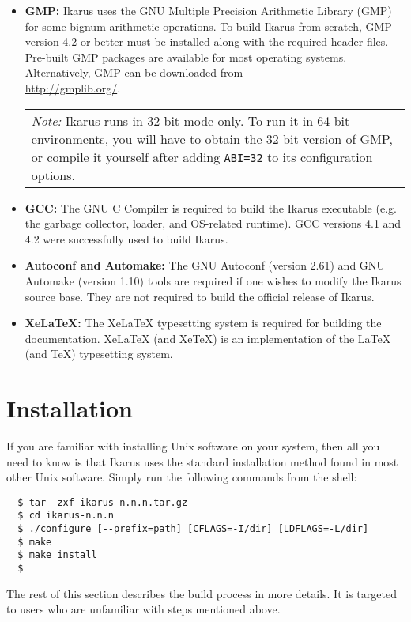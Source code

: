 \documentclass[onecolumn, 12pt, twoside, openright, dvipdfm]{book}
\newcommand{\BoxedText}[2]{
  \vspace{.05in}
  \begin{center}
    \begin{tabular}{|p{4.6in}|} {\large \emph{#1}} #2 \end{tabular}
  \end{center}
  \vspace{.05in}
}
\begin{document}
\begin{itemize}
\item\textbf{GMP:} Ikarus uses the GNU Multiple Precision Arithmetic
Library (GMP) for some bignum arithmetic operations.  To build
Ikarus from scratch, GMP version 4.2 or better must be installed
along with the required header files.  Pre-built GMP packages  are
available for most operating systems.  Alternatively, GMP can be
downloaded from \\
\url{http://gmplib.org/}.

\BoxedText{Note:}{Ikarus runs in 32-bit mode only.  
To run it in 64-bit environments, you will have to obtain the 32-bit
version of GMP, or compile it yourself after adding \texttt{ABI=32}
to its configuration options.}


\item\textbf{GCC:} The GNU C Compiler is required to build the Ikarus
executable (e.g. the garbage collector, loader, and OS-related
runtime).  GCC versions 4.1 and 4.2 were successfully used to build
Ikarus.

\item\textbf{Autoconf and Automake:} The GNU Autoconf (version 2.61)
and GNU Automake (version 1.10) tools are required if one
wishes to modify the Ikarus source base.  They are not
required to build the official release of Ikarus.

\item\textbf{XeLaTeX:}  The XeLaTeX typesetting system is required
for building the documentation.  XeLaTeX (and XeTeX) is an
implementation of the LaTeX (and TeX) typesetting system.

\end{itemize}

\section{Installation}

If you are familiar with installing Unix software on your system,
then all you need to know is that Ikarus uses the standard
installation method found in most other Unix software.  Simply run
the following commands from the shell:
\begin{verbatim}
  $ tar -zxf ikarus-n.n.n.tar.gz
  $ cd ikarus-n.n.n
  $ ./configure [--prefix=path] [CFLAGS=-I/dir] [LDFLAGS=-L/dir]
  $ make
  $ make install
  $
\end{verbatim}

The rest of this section describes the build process in more
details.  It is targeted to users who are unfamiliar with steps
mentioned above.
\end{document}
